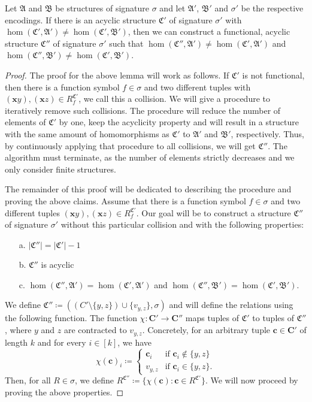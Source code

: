 \begin{lemma}
	Let $\mathfrak A$ and $\mathfrak B$ be structures of signature $\sigma$ and let $\mathfrak A'$, $\mathfrak B'$ and $\sigma'$ be the respective encodings.
	If there is an acyclic structure $\mathfrak C'$ of signature $\sigma'$ with $\hom(\mathfrak C',\mathfrak A')\neq\hom(\mathfrak C',\mathfrak B')$, then we can construct a functional, acyclic structure $\mathfrak C''$ of signature $\sigma'$ such that $\hom(\mathfrak C'',\mathfrak A')\neq\hom(\mathfrak C',\mathfrak A')$ and $\hom(\mathfrak C'',\mathfrak B')\neq\hom(\mathfrak C',\mathfrak B')$.
	\label{lem:constructionOfFunctionalStruct}
\end{lemma}
\begin{proof}
	The proof for the above lemma will work as follows.
	If $\mathfrak C'$ is not functional, then there is a function symbol $f\in\sigma$ and two different tuples with $(\mathbf xy),(\mathbf xz)\in R^{\mathfrak C'}_f$, we call this a collision.
	We will give a procedure to iteratively remove such collisions.
	The procedure will reduce the number of elements of $\mathfrak C'$ by one, keep the acyclicity property and will result in a structure with the same amount of homomorphisms as $\mathfrak C'$ to $\mathfrak A'$ and $\mathfrak B'$, respectively.
	Thus, by continuously applying that procedure to all collisions, we will get $\mathfrak C''$.
	The algorithm must terminate, as the number of elements strictly decreases and we only consider finite structures.
	
	The remainder of this proof will be dedicated to describing the procedure and proving the above claims.
	Assume that there is a function symbol $f\in \sigma$ and two different tuples $(\mathbf x y),(\mathbf x z)\in R_f^{\mathfrak C'}$. 
	Our goal will be to construct a structure $\mathfrak C''$ of signature $\sigma'$ without this particular collision and with the following properties:
	\begin{itemize}
		\item[a.] $\vert \mathfrak C'' \vert = \vert \mathfrak C'\vert -1$
		\item[b.] $\mathfrak C''$ is acyclic
		\item[c.] $\hom(\mathfrak C'',\mathfrak A')=\hom(\mathfrak C',\mathfrak A')$ and $\hom(\mathfrak C'',\mathfrak B')=\hom(\mathfrak C',\mathfrak B')$.
	\end{itemize}
	We define $\mathfrak C'' \coloneqq ((C' \setminus \{y,z\})\cup \{v_{y,z}\}, \sigma)$ and will define the relations using the following function.
	The function $\chi : \mathbf{C'}\to\mathbf{C''}$ maps tuples of $\mathfrak C'$ to tuples of $\mathfrak C''$, where $y$ and $z$ are contracted to $v_{y,z}$.
	Concretely, for an arbitrary tuple $\mathbf c\in \mathbf{C'}$ of length $k$ and for every $i\in[k]$, we have
	$$\chi(\mathbf c)_i \coloneqq \begin{cases}
		\mathbf c_i & \text{if } \mathbf c_i\notin \{y,z\} \\
		v_{y,z} & \text{if } \mathbf c_i \in \{y,z\}.
	\end{cases}$$
	Then, for all $R\in\sigma$, we define $R^{\mathfrak C''}\coloneqq \{\chi(\mathbf c) : \mathbf c\in R^{\mathfrak C'}\}$.
	We will now proceed by proving the above properties.
	

\end{proof}
